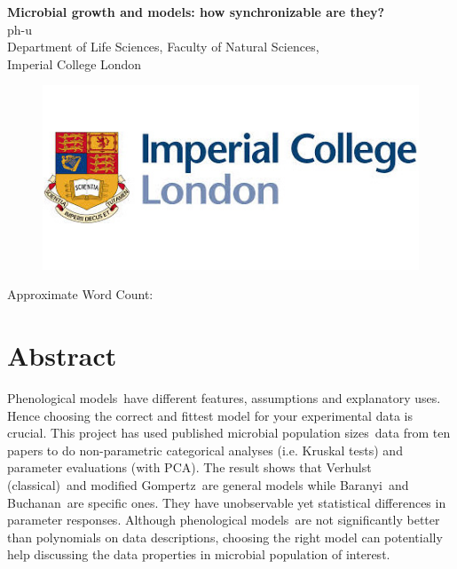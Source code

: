 \documentclass[a4paper, 11pt]{article}
\title{\ReportTitle}
\author{\ReportAuthor\ (CID: 01786076)}
\date{}
\newcommand{\pms}{phenological models}
\newcommand{\Pms}{Phenological models}
\newcommand{\ReportTitle}{Microbial growth and models: how synchronizable are they?} %
\newcommand{\ReportAuthor}{ph-u}
\newcommand{\ReportAffil}{Department of Life Sciences, Faculty of Natural Sciences,\\Imperial College London}
\newcommand{\fve}{Verhulst (classical)}
\newcommand{\fgo}{modified Gompertz}
\newcommand{\fba}{Baranyi}
\newcommand{\fbu}{Buchanan}
\newcommand{\pps}{population sizes}
\begin{document}
	\begin{center}
		\Huge\textbf{\ReportTitle}\\
		\LARGE\ReportAuthor\\
		\Large\ReportAffil
	\end{center}
	\begin{figure}[h]
		\centering\includegraphics[width=\linewidth]{icl.jpg}
	\end{figure}
	\begin{flushright}
		\Large Approximate Word Count: %
	\end{flushright}
	\clearpage
	
	\maketitle
	\section*{Abstract}
	\Pms\ have different features, assumptions and explanatory uses.  Hence choosing the correct and fittest model for your experimental data is crucial.  This project has used published microbial \pps\ data from ten papers to do non-parametric categorical analyses (i.e. Kruskal tests) and parameter evaluations (with PCA).  The result shows that \fve\ and \fgo\ are general models while \fba\ and \fbu\ are specific ones.  They have unobservable yet statistical differences in parameter responses.  Although \pms\ are not significantly better than polynomials on data descriptions, choosing the right model can potentially help discussing the data properties in microbial population of interest.
	
\end{document}

